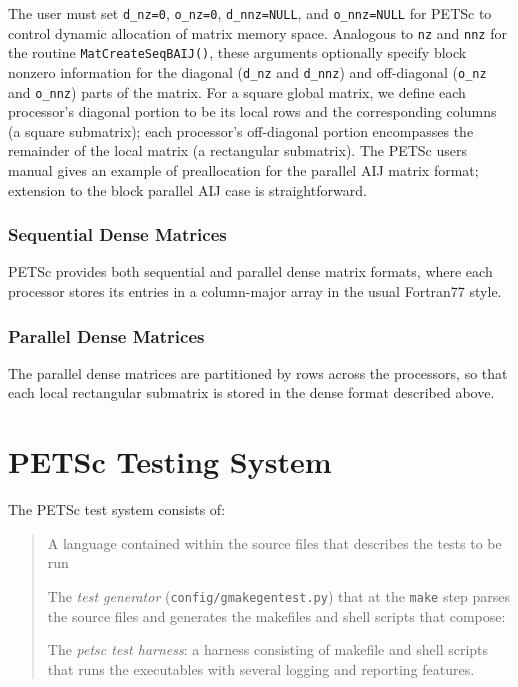 The user must set \lstinline{d_nz=0}, \lstinline{o_nz=0}, \lstinline{d_nnz=NULL}, and
\lstinline{o_nnz=NULL} for PETSc to control dynamic allocation of matrix
memory space.  Analogous to \lstinline{nz} and \lstinline{nnz} for the routine
\lstinline{MatCreateSeqBAIJ()}, these arguments optionally specify
block nonzero information for the diagonal (\lstinline{d_nz} and \lstinline{d_nnz}) and
off-diagonal (\lstinline{o_nz} and \lstinline{o_nnz}) parts of the matrix.
For a square global matrix, we define each processor's diagonal portion
to be its local rows and the corresponding columns (a square submatrix);
each processor's off-diagonal portion encompasses the remainder of the
local matrix (a rectangular submatrix).
The PETSc users manual gives an example of preallocation for
the parallel AIJ matrix format; extension to the block parallel AIJ case
is straightforward.

\subsection{Sequential Dense Matrices}

PETSc provides both sequential and parallel dense matrix formats,
where each processor stores its entries in a column-major array in the
usual Fortran77 style.

\subsection{Parallel Dense Matrices}

The parallel dense matrices are partitioned by rows across the
processors, so that each local rectangular submatrix is stored in the
dense format described above.


\chapter{PETSc Testing System}
  \label{petsc-testing-system}


The PETSc test system consists of:
%
\begin{quote}
\begin{list}{.}
{
\setlength{\rightmargin}{\leftmargin}
}

\item A language contained within the source files that describes the
tests to be run

\item The \emph{test generator} (\lstinline{config/gmakegentest.py}) that at the
\lstinline{make} step parses the source files and generates the makefiles
and shell scripts that compose:

\item The \emph{petsc test harness}: a harness consisting of makefile and
shell scripts that runs the executables with several
logging and reporting features.
\end{list}

\end{quote}

